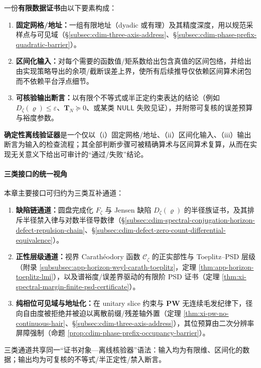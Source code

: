 \begin{definition}[有限数据证书与确定性离线验证器]\label{def:cdim-finite-data-certificate-offline-verifier}
一份\textbf{有限数据证书}由以下要素构成：
\begin{enumerate}
  \item \textbf{固定网格/地址：}一组有限地址（dyadic 或有理）及其精度深度，用以规范采样点与可见域（\S\ref{subsec:cdim-three-axis-address}、\S\ref{subsec:cdim-phase-prefix-quadratic-barrier}）。
  \item \textbf{区间化输入：}对每个需要的函数值/矩系数给出包含真值的区间包络，并给出由实现策略导出的余项/截断误差上界，使所有后续推导仅依赖区间算术闭包而不依赖平台浮点细节。
  \item \textbf{可核验输出断言：}以有限个不等式或半正定约束表达的结论（例如 \(D_{\zeta}(\varrho)\le\varepsilon\)、\(\mathbf{T}_N\succeq 0\)、或某类 \(\mathsf{NULL}\) 失败见证），并附带可复核的误差预算与裕度参数。
\end{enumerate}
\textbf{确定性离线验证器}是一个仅以（i）固定网格/地址、（ii）区间化输入、（iii）输出断言为输入的检查流程；其全部判断步骤可被精确算术与区间算术复算，从而在实现无关意义下给出可审计的“通过/失败”结论。
\end{definition}

\paragraph{三类接口的统一视角}
本章主要接口可归约为三类互补通道：
\begin{enumerate}
  \item \textbf{缺陷链通道：}圆盘完成化 \(F_{\zeta}\) 与 Jensen 缺陷 \(D_{\zeta}(\varrho)\) 的半径族证书，及其排斥半径禁入律与对数半径导数律（\S\ref{subsec:cdim-spectral-conjugation-horizon-defect-repulsion-chain}、\S\ref{subsec:cdim-defect-zero-count-differential-equivalence}）。
  \item \textbf{正性层级通道：}视界 Carath\'eodory 函数 \(\mathscr{C}_{\zeta}\) 的正实部性与 Toeplitz--PSD 层级（附录 \ref{subsubsec:app-horizon-weyl-carath-toeplitz}，定理 \ref{thm:app-horizon-toeplitz-lmi}），以及谱裕度/误差界驱动的有限阶 PSD 证书（定理 \ref{thm:xi-spectral-margin-finite-psd-certificate}）。
  \item \textbf{纯相位可见域与地址化：}在 unitary slice 约束与 \(\mathbf{PW}\) 无连续毛发纪律下，径向自由度被拒绝并被迫以离散前缀/残差轴外置（定理 \ref{thm:xi-pw-no-continuous-hair}、\S\ref{subsec:cdim-three-axis-address}），其位预算由二次分辨率屏障强制（命题 \ref{prop:cdim-phase-prefix-occupancy-barrier}）。
\end{enumerate}
三类通道共享同一“证书对象—离线核验器”语法：输入均为有限维、区间化的数据；输出均为可复核的不等式/半正定性/禁入断言。

